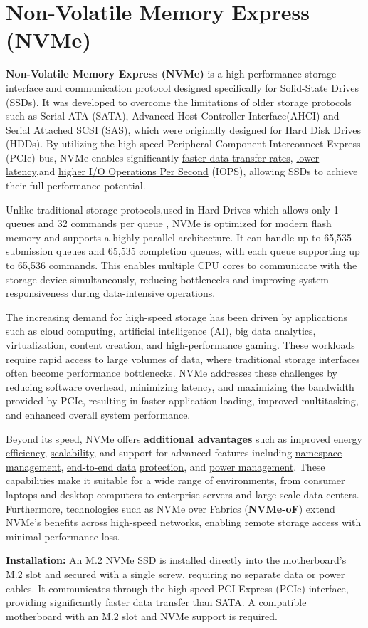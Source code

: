 \newpage
\section{Non-Volatile Memory Express (NVMe)}
\textbf{Non-Volatile Memory Express (NVMe)} is a high-performance storage interface and communication protocol designed specifically for 
Solid-State Drives (SSDs). It was developed to overcome the limitations of older storage protocols such as Serial ATA (SATA), 
Advanced Host Controller Interface(AHCI) and Serial Attached SCSI (SAS), which were originally designed for Hard Disk Drives (HDDs). 
By utilizing the high-speed Peripheral Component Interconnect Express (PCIe) bus, NVMe enables significantly \underline{faster data transfer rates}, 
\underline{lower latency},and \underline{higher I/O Operations Per Second} (IOPS), allowing SSDs to achieve their full performance potential.


Unlike traditional storage protocols,used in Hard Drives which allows only 1 queues and 32 commands per queue , NVMe is optimized for modern 
flash memory and supports a highly parallel architecture. It can handle up to 65,535 submission queues and 65,535 completion queues, with each 
queue supporting up to 65,536 commands. This enables multiple CPU cores to communicate with the storage device simultaneously, reducing bottlenecks 
and improving system responsiveness during data-intensive operations.

The increasing demand for high-speed storage has been driven by applications such as cloud computing, artificial intelligence (AI), big data analytics, 
virtualization, content creation, and high-performance gaming. These workloads require rapid access to large volumes of data, where traditional storage 
interfaces often become performance bottlenecks. NVMe addresses these challenges by reducing software overhead, minimizing latency, and maximizing the 
bandwidth provided by PCIe, resulting in faster application loading, improved multitasking, and enhanced overall system performance.


Beyond its speed, NVMe offers \textbf{additional advantages} such as \underline{improved energy efficiency}, \ul{scalability}, and support for advanced 
features including \underline{namespace management}, \ul{end-to-end data} \underline{protection}, and \underline{power management}. These capabilities 
make it suitable for a wide range of environments, from consumer laptops and desktop computers to enterprise servers and large-scale data centers. 
Furthermore, technologies such as NVMe over Fabrics (\textbf{NVMe-oF}) extend NVMe's benefits across high-speed networks, enabling remote storage access 
with minimal performance loss.


\textbf{Installation:} An M.2 NVMe SSD is installed directly into the motherboard's M.2 slot and secured with a single screw, requiring no separate data 
or power cables. It communicates through the high-speed PCI Express (PCIe) interface, providing significantly faster data transfer than SATA. A compatible 
motherboard with an M.2 slot and NVMe support is required.
\cite{lexar_nvme}